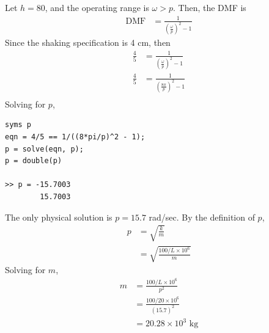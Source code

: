 \subsection{}
Let $h = 80$, and the operating range is $\omega > p$. Then, the DMF is
\begin{align*}
    \text{DMF} &= \frac{1}{\left(\frac{\omega}{p}\right)^2 - 1}
\end{align*}
Since the shaking specification is 4 cm, then
\begin{align*}
    \frac{4}{5} &= \frac{1}{\left(\frac{\omega}{p}\right)^2 - 1} \\
    \frac{4}{5} &= \frac{1}{\left(\frac{8\pi}{p}\right)^2 - 1} \\
\end{align*}
Solving for $p$, 
\begin{verbatim}
syms p
eqn = 4/5 == 1/((8*pi/p)^2 - 1);
p = solve(eqn, p);
p = double(p)

>> p = -15.7003
        15.7003
\end{verbatim}
The only physical solution is $p = 15.7$ rad/sec.
By the definition of $p$,
\begin{align*}
    p &= \sqrt{\frac{k}{m}} \\
    &= \sqrt{\frac{100/L \times 10^6}{m}} 
\end{align*}
Solving for $m$,
\begin{align*}
    m &= \frac{100/L \times 10^6}{p^2} \\
    &= \frac{100/20 \times 10^6}{(15.7)^2} \\
    &= \boxed{20.28 \times 10^3 \text{ kg}}
\end{align*}
